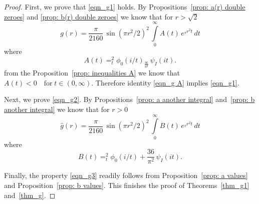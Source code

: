 \begin{proof}
First, we prove that \eqref{eqn_g1} holds. By Propositions~\ref{prop: a(r) double zeroes} and \ref{prop: b(r) double zeroes} we know that for $r>\sqrt{2}$
\begin{equation}\label{eqn_g A} g(r)=\frac{\pi}{2160}\,\sin(\pi r^2/2)^2\,\int\limits_0^\infty A(t)\,e^{_\pi r^2 t}\,dt\end{equation}
where $$A(t)=_t^2\phi_0(i/t)_\frac{36}{\pi^2}\,\psi_I(it).$$
from the Proposition~\ref{prop: inequalities A} we know that $A(t)<0\quad\mbox{for}\;t\in(0,\infty).$
Therefore identity \eqref{eqn_g A} implies \eqref{eqn_g1}.

Next, we prove \eqref{eqn_g2}. By Propositions~\ref{prop: a another integral} and~\ref{prop: b another integral} we know that for $r>0$
\begin{equation}\label{eqn_g B} \widehat{g}(r)=\frac{\pi}{2160}\,\sin(\pi r^2/2)^2\,\int\limits_0^\infty B(t)\,e^{_\pi r^2 t}\,dt\end{equation}
where $$B(t)=_t^2\phi_0(i/t)+\frac{36}{\pi^2}\,\psi_I(it).$$


Finally, the property \eqref{eqn_g3} readily follows from Proposition~\ref{prop: a values} and Proposition~\ref{prop: b values}.
This finishes the proof of Theorems~\ref{thm_g1} and~\ref{thm_g}.
  \end{proof}
